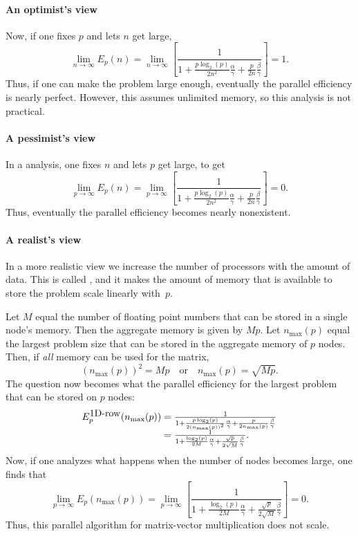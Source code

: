 \paragraph*{An optimist's view}

Now, if one fixes $ p $ and lets $ n $ get large,
\[
\lim_{n \rightarrow \infty} E_p( n ) =
\lim_{n \rightarrow \infty}
\left[
\frac{1}
{ 1 + \frac{p \log_2(p)}{2 n^2} \frac{\alpha}{\gamma} 
+ \frac{p}{2 n} \frac{\beta}{\gamma} }
\right]
=
1.
\]
Thus, if one can make the problem large enough, eventually the parallel
efficiency is nearly perfect. However, this assumes unlimited memory,
so this analysis is not practical.



\paragraph*{A pessimist's view}

In a  analysis,
one fixes $ n $ and lets $ p $ get large, to get
\[
\lim_{p \rightarrow \infty} E_p( n ) =
\lim_{p \rightarrow \infty}
\left[
\frac{1}
{1 + \frac{p \log_2(p)}{2 n^2} \frac{\alpha}{\gamma} 
+ \frac{p}{2 n} \frac{\beta}{\gamma} }
\right]
=
0.
\]
Thus, eventually the parallel efficiency becomes nearly nonexistent.

\paragraph*{A realist's view}

In a more realistic view we increase the number of processors with the
amount of data. This is called , and 
it makes the amount of memory that is available to
store the problem scale linearly with~$ p $.  

Let $ M $ equal the
number of floating point numbers that can be stored in a single node's
memory.  Then the aggregate memory is given by $ M p $.  Let $
n_{\max}(p) $ equal the largest problem size that can be stored
in the aggregate memory of $ p $ nodes.  Then, if {\em all} memory can
be used for the matrix,
\[
(n_{\max}(p))^2 = M p
\quad
\mbox{or}
\quad
n_{\max}(p) = \sqrt{Mp}.
\]
The question now becomes what the parallel 
efficiency for the largest problem that can be stored on $ p $ nodes:
\[ 
\begin{array}{r@{{}={}}l}
E_p^{\mbox{1D-row}}(n_{\max}(p)) &
\frac{1}
{1 + \frac{p \log_2(p)}{2 (n_{\max}(p))^2} \frac{\alpha}{\gamma} 
+ \frac{p}{2 n_{\max}(p)} \frac{\beta}{\gamma} }
\\
&
\frac{1}
{ 1 + \frac{\log_2(p)}{2 M} \frac{\alpha}{\gamma} 
+ \frac{\sqrt{p}}{2 \sqrt{M}} \frac{\beta}{\gamma} }.
\end{array}
\]
Now, if one analyzes what happens when the number of nodes
becomes large, one finds that
\[
\lim_{p \rightarrow \infty} E_p( n_{\max}(p) ) 
=
\lim_{p \rightarrow \infty}
\left[
\frac{1}
{1 + \frac{\log_2(p)}{2 M} \frac{\alpha}{\gamma} 
+ \frac{\sqrt{p}}{2 \sqrt{M}} \frac{\beta}{\gamma} }
\right]
=
0.
\]
Thus, this parallel algorithm for matrix-vector multiplication does
not scale. 

